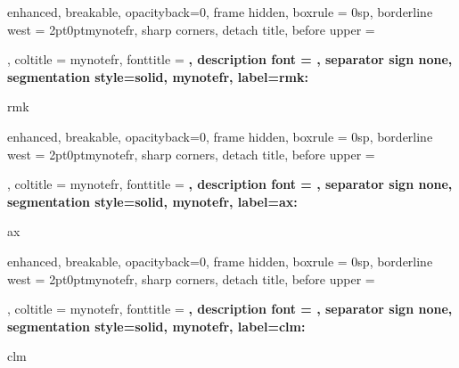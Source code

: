 \makeatletter
{}
\makeatother
{%
	enhanced,
	breakable,
	opacityback=0,
	frame hidden,
	boxrule = 0sp,
	borderline west = {2pt}{0pt}{mynotefr},
	sharp corners,
	detach title,
	before upper = \tcbtitle\par\smallskip,
	coltitle = mynotefr,
	fonttitle = \bfseries\sffamily,
	description font = \mdseries,
	separator sign none,
	segmentation style={solid, mynotefr},
    label={rmk:\thetcbcounter}
}
{rmk}
{%
	enhanced,
	breakable,
	opacityback=0,
	frame hidden,
	boxrule = 0sp,
	borderline west = {2pt}{0pt}{mynotefr},
	sharp corners,
	detach title,
	before upper = \tcbtitle\par\smallskip,
	coltitle = mynotefr,
	fonttitle = \bfseries\sffamily,
	description font = \mdseries,
	separator sign none,
	segmentation style={solid, mynotefr},
    label={ax:\thetcbcounter}
}
{ax}
{%
	enhanced,
	breakable,
	opacityback=0,
	frame hidden,
	boxrule = 0sp,
	borderline west = {2pt}{0pt}{mynotefr},
	sharp corners,
	detach title,
	before upper = \tcbtitle\par\smallskip,
	coltitle = mynotefr,
	fonttitle = \bfseries\sffamily,
	description font = \mdseries,
	separator sign none,
	segmentation style={solid, mynotefr},
    label={clm:\thetcbcounter}
}
{clm}
\newcommand{\Section}[1]{%
    \refstepcounter{section}%
    \section*{*\thesection\quad #1}%
    \addcontentsline{toc}{section}{\protect\numberline{*\thesection}#1}%
}
